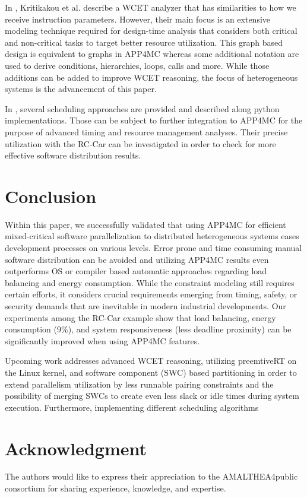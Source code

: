 \documentclass [a4paper,final,conference,10pt]{IDAACS}
\begin{document}
In \cite{Kritikakou2014}, Kritikakou et al. describe a WCET analyzer that has similarities to how we receive instruction parameters. However, their main focus is an extensive modeling technique required for design-time analysis that considers both critical and non-critical tasks to target better resource utilization. This graph based design is equivalent to graphs in APP4MC whereas some additional notation are used to derive conditions, hierarchies, loops, calls and more. While those additions can be added to improve WCET reasoning, the focus of heterogeneous systems is the advancement of this paper.

In \cite{cheramy2014}, several scheduling approaches are provided and described along python implementations. Those can be subject to further integration to APP4MC for the purpose of advanced timing and resource management analyses. Their precise utilization with the RC-Car can be investigated in order to check for more effective software distribution results.
\section{Conclusion}
\label{sec:concl}
Within this paper, we successfully validated that using APP4MC for efficient mixed-critical software parallelization to distributed heterogeneous systems eases development processes on various levels. Error prone and time consuming manual software distribution can be avoided and utilizing APP4MC results even outperforms OS or compiler based automatic approaches regarding load balancing and energy consumption. While the constraint modeling still requires certain efforts, it considers crucial requirements emerging from timing, safety, or security demands that are inevitable in modern industrial developments. Our experiments among the RC-Car example show that load balancing, energy consumption (9\%), and system responsiveness (less deadline proximity) can be significantly improved when using APP4MC features.

Upcoming work addresses advanced WCET reasoning, utilizing preemtiveRT\cite{preemptrt} on the Linux kernel, and software component (SWC) based partitioning in order to extend parallelism utilization by less runnable pairing constraints and the possibility of merging SWCs to create even less slack or idle times during system execution. Furthermore, implementing different scheduling algorithms 
\section*{Acknowledgment}
The authors would like to express their appreciation to the AMALTHEA4public consortium for sharing experience, knowledge, and expertise. %


\end{document}
